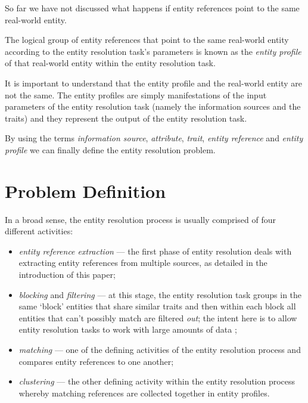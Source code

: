 \documentclass[lettersize,journal]{IEEEtran}
\begin{document}
    So far we have not discussed what happens if entity references point to the
    same real-world entity.
    
    \begin{defn}
        The logical group of entity references that point to the same real-world
        entity according to the entity resolution task's parameters is known as
        the \textit{entity profile} of that real-world entity within the entity
        resolution task.
    \end{defn}

    It is important to understand that the entity profile and the real-world
    entity are not the same.
    The entity profiles are simply manifestations of the input parameters of the
    entity resolution task (namely the information sources and the traits) and
    they represent the output of the entity resolution task.
    
    By using the terms \textit{information source}, \textit{attribute},
    \textit{trait}, \textit{entity reference} and \textit{entity profile} we can
    finally define the entity resolution problem.

    \section{Problem Definition}\label{sec:problem}

    In a broad sense, the entity resolution process is usually comprised of four
    different activities\cite{Pap19,Tal11}:
    \begin{itemize}
        \item \textit{entity reference extraction} --- the first phase of entity
        resolution deals with extracting entity references from multiple
        sources, as detailed in the introduction of this paper;
        \item \textit{blocking} and \textit{filtering} --- at this stage, the
        entity resolution task groups in the same `block' entities that share
        similar traits and then within each block all entities that can't
        possibly match are filtered \textit{out}; the intent here is to allow
        entity resolution tasks to work with large amounts of data \cite{Pap19};
        \item \textit{matching} --- one of the defining activities of the entity
        resolution process and compares entity references to one another;
        \item \textit{clustering} --- the other defining activity within the
        entity resolution process whereby matching references are collected
        together in entity profiles.
    \end{itemize}
\end{document}

